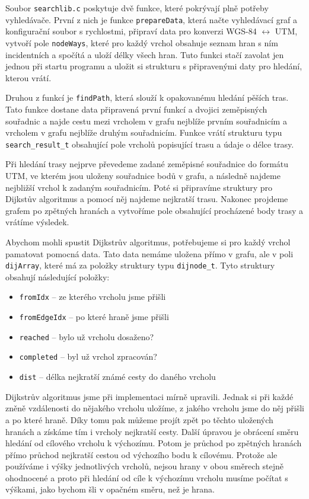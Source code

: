 Soubor \verb|searchlib.c| poskytuje dvě funkce, které pokrývají plně potřeby
vyhledávače. První z nich je funkce \verb|prepareData|, která načte vyhledávací
graf a konfigurační soubor s rychlostmi, připraví data pro konverzi WGS-84
$\leftrightarrow$ UTM, vytvoří pole \verb|nodeWays|, které pro každý vrchol
obsahuje seznam hran s ním incidentních a spočítá a uloží délky všech hran. Tuto
funkci stačí zavolat jen jednou při startu programu a uložit si strukturu s
připravenými daty pro hledání, kterou vrátí.

Druhou z funkcí je \verb|findPath|, která slouží k opakovanému hledání pěších
tras. Tato funkce dostane data připravená první funkcí a dvojici zeměpisných
souřadnic a najde cestu mezi vrcholem v grafu nejblíže prvním souřadnicím a
vrcholem v grafu nejblíže druhým souřadnicím. Funkce vrátí strukturu typu
\verb|search_result_t| obsahující pole vrcholů popisující trasu a údaje o délce
trasy.

Při hledání trasy nejprve převedeme zadané zeměpisné souřadnice do formátu UTM,
ve kterém jsou uloženy souřadnice bodů v grafu, a následně najdeme nejbližší
vrchol k zadaným souřadnicím. Poté si připravíme struktury pro Dijkstův
algoritmus a pomocí něj najdeme nejkratší trasu. Nakonec projdeme grafem po
zpětných hranách a vytvoříme pole obsahující procházené body trasy a vrátíme
výsledek.

Abychom mohli spustit Dijkstrův algoritmus, potřebujeme si pro každý vrchol
pamatovat pomocná data. Tato data nemáme uložena přímo v grafu, ale v poli
\verb|dijArray|, které má za položky struktury typu \verb|dijnode_t|. Tyto
struktury obsahují následující položky:
\begin{itemize}
	\item \verb|fromIdx| -- ze kterého vrcholu jsme přišli 
	\item \verb|fromEdgeIdx| -- po které hraně jsme přišli
	\item \verb|reached| -- bylo už vrcholu dosaženo? 
	\item \verb|completed| -- byl už vrchol zpracován?
	\item \verb|dist| -- délka nejkratší známé cesty do daného vrcholu
\end{itemize}

Dijkstrův algoritmus jsme při implementaci mírně upravili. Jednak si při každé
zněně vzdálenosti do nějakého vrcholu uložíme, z jakého vrcholu jsme do něj
přišli a po které hraně. Díky tomu pak můžeme projít zpět po těchto uložených
hranách a získáme tím i vrcholy nejkratší cesty. Další úpravou je obrácení směru
hledání od cílového vrcholu k výchozímu. Potom je průchod po zpětných hranách
přímo průchod nejkratší cestou od výchozího bodu k cílovému. Protože ale
používáme i výšky jednotlivých vrcholů, nejsou hrany v obou směrech stejně
ohodnocené a proto při hledání od cíle k výchozímu vrcholu musíme počítat s
výškami, jako bychom šli v opačném směru, než je hrana.

